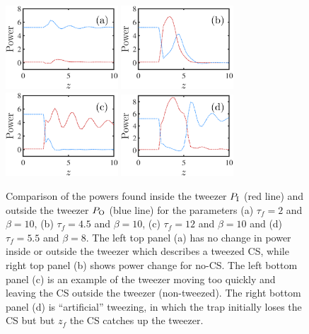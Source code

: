 \documentclass[aps,floatfix,showpacs,preprintnumbers,twocolumn,nofootinbib]{revtex4}
\begin{document}
\begin{figure}[htb!]
\centering
\includegraphics[width=4.2cm]{regularTimeMass1.eps} 
\includegraphics[width=4.2cm]{regularTimeMass5.eps} 
\\
\includegraphics[width=4.2cm]{regularTimeMass3.eps} 
\includegraphics[width=4.2cm]{regularTimeMass6.eps}
\vspace{-0.5em}
\caption[Tweezer with Natural Width Power Comparison]{Comparison of the powers found inside the tweezer $P_{\rm I}$ (red line) and outside the tweezer $P_{\rm O}$ (blue line) for the parameters (a) $\tau_f = 2$ and $\beta=10$, (b) $\tau_f = 4.5$ and $\beta=10$, (c) $\tau_f = 12$ and $\beta=10$ and (d) $\tau_f = 5.5$ and $\beta=8$.  The left top panel (a) has no change in power inside or outside the tweezer which describes a tweezed CS, while right top panel (b) shows power change for no-CS.  The left bottom panel (c) is an example of the tweezer moving too quickly and leaving the CS outside the tweezer (non-tweezed).  The right bottom panel (d) is ``artificial'' tweezing, in which the trap initially loses the CS but but $z_f$ the CS catches up the tweezer.
}
\label{fig:RegularComp}
\end{figure}
\end{document}
